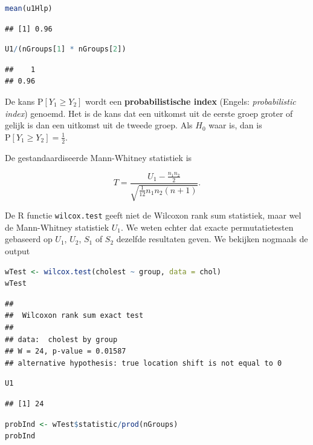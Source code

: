 \documentclass[
  12pt,dutch,coursenotes]{book}
\newcommand{\passthrough}[1]{#1}
\theoremstyle{definition}
\theoremstyle{definition}
\theoremstyle{definition}
\theoremstyle{definition}
\theoremstyle{remark}
\begin{document}
\begin{lstlisting}[language=R]
mean(u1Hlp)
\end{lstlisting}

\begin{lstlisting}
## [1] 0.96
\end{lstlisting}

\begin{lstlisting}[language=R]
U1/(nGroups[1] * nGroups[2])
\end{lstlisting}

\begin{lstlisting}
##    1 
## 0.96
\end{lstlisting}

De kans \(\text{P}\left[Y_1 \geq Y_2\right]\) wordt een \textbf{probabilistische index} (Engels: \emph{probabilistic index}) genoemd.
Het is de kans dat een uitkomst uit de eerste groep groter of gelijk is dan een uitkomst uit de tweede groep.
Als \(H_0\) waar is, dan is \(\text{P}\left[Y_1 \geq Y_2\right]=\frac{1}{2}\).

De gestandaardiseerde Mann-Whitney statistiek is

\[
  T = \frac{U_1 - \frac{n_1n_2}{2}}{\sqrt{\frac{1}{12}n_1n_2(n+1)}}.
\]

De R functie \passthrough{\lstinline!wilcox.test!} geeft niet de Wilcoxon rank sum statistiek, maar wel de Mann-Whitney statistiek \(U_1\).
We weten echter dat exacte permutatietesten gebaseerd op \(U_1\), \(U_2\), \(S_1\) of \(S_2\) dezelfde resultaten geven.
We bekijken nogmaals de output

\begin{lstlisting}[language=R]
wTest <- wilcox.test(cholest ~ group, data = chol)
wTest
\end{lstlisting}

\begin{lstlisting}
## 
##  Wilcoxon rank sum exact test
## 
## data:  cholest by group
## W = 24, p-value = 0.01587
## alternative hypothesis: true location shift is not equal to 0
\end{lstlisting}

\begin{lstlisting}[language=R]
U1
\end{lstlisting}

\begin{lstlisting}
## [1] 24
\end{lstlisting}

\begin{lstlisting}[language=R]
probInd <- wTest$statistic/prod(nGroups)
probInd
\end{lstlisting}
\end{document}
